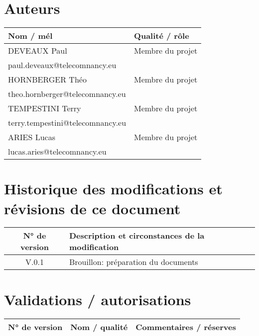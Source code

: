 \documentclass{report}
\begin{document}
\begin{center}
    \textbf{\color{orange}{\Huge Projet PPII - Charte}}
\end{center}
\vspace{0.7cm}
\section*{\color{orange}Auteurs}
\begin{tabular}{l|p{8cm}}
   \textbf{Nom / mél} & \textbf{Qualité / rôle}  \\
   \hline 
    DEVEAUX Paul & Membre du projet  \\
    paul.deveaux@telecomnancy.eu & \\ \hline
    HORNBERGER Théo & Membre du projet \\
    theo.hornberger@telecomnancy.eu & \\ \hline
    TEMPESTINI Terry & Membre du projet \\
    terry.tempestini@telecomnancy.eu & \\ \hline
    ARIES Lucas & Membre du projet \\
    lucas.aries@telecomnancy.eu & \\ \hline
\end{tabular}

\vspace{0.5cm}

\section*{\color{orange}Historique des modifications et révisions de ce document}
\begin{tabular}{c|p{10cm}}
   \textbf{N° de version} & \textbf{Description et circonstances de la modification}  \\
   \hline 
    V.0.1 & Brouillon: préparation du documents
    \\ \hline
\end{tabular}

\vspace{0.5cm}

\section*{\color{orange}Validations / autorisations}
\begin{tabular}{c|p{4cm}|p{6cm}}
   \textbf{N° de version} & \textbf{Nom / qualité} & \textbf{Commentaires / réserves}
    \\ \hline
\end{tabular}
\end{document}
